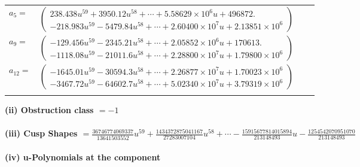 \documentclass[1p]{elsarticle_modified}
\theoremstyle{definition}
\begin{document}
\begin{tabular}{m{7pt} m{180pt} m{7pt} m{180pt} }
\flushright $a_{5}=$&$\begin{pmatrix}238.438 u^{59}+3950.12 u^{58}+\cdots+5.58629\times10^{6} u+496872.\\-218.983 u^{59}-5479.84 u^{58}+\cdots+2.60400\times10^{7} u+2.13851\times10^{6}\end{pmatrix}$ \\
\flushright $a_{9}=$&$\begin{pmatrix}-129.456 u^{59}-2345.21 u^{58}+\cdots+2.05852\times10^{6} u+170613.\\-1118.08 u^{59}-21011.6 u^{58}+\cdots+2.28800\times10^{7} u+1.79800\times10^{6}\end{pmatrix}$ \\
\flushright $a_{12}=$&$\begin{pmatrix}-1645.01 u^{59}-30594.3 u^{58}+\cdots+2.26877\times10^{7} u+1.70023\times10^{6}\\-3467.72 u^{59}-64602.7 u^{58}+\cdots+5.02340\times10^{7} u+3.79319\times10^{6}\end{pmatrix}$\\&\end{tabular}
\flushleft \textbf{(ii) Obstruction class $= -1$}\\~\\
\flushleft \textbf{(iii) Cusp Shapes $= \frac{36746774069337}{13641503552} u^{59}+\frac{1434372875041167}{27283007104} u^{58}+\cdots-\frac{15915677814015894}{213148493} u-\frac{1254542070951070}{213148493}$}\\~\\
\newpage\renewcommand{\arraystretch}{1}
\flushleft \textbf{(iv) u-Polynomials at the component}\newline \\
\end{document}
